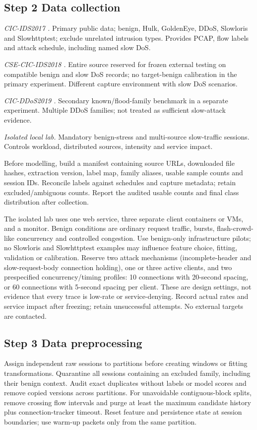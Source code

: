 \documentclass[conference]{IEEEtran}
\begin{document}
\subsection{Step 2 Data collection}
\noindent\textit{CIC-IDS2017 \cite{ref12}.} Primary public data; benign, Hulk, GoldenEye, DDoS, Slowloris and Slowhttptest; exclude unrelated intrusion types. Provides PCAP, flow labels and attack schedule, including named slow DoS.

\noindent\textit{CSE-CIC-IDS2018 \cite{ref13}.} Entire source reserved for frozen external testing on compatible benign and slow DoS records; no target-benign calibration in the primary experiment. Different capture environment with slow DoS scenarios.

\noindent\textit{CIC-DDoS2019 \cite{ref14}.} Secondary known/flood-family benchmark in a separate experiment. Multiple DDoS families; not treated as sufficient slow-attack evidence.

\noindent\textit{Isolated local lab.} Mandatory benign-stress and multi-source slow-traffic sessions. Controls workload, distributed sources, intensity and service impact.

Before modelling, build a manifest containing source URLs, downloaded file hashes, extraction version, label map, family aliases, usable sample counts and session IDs. Reconcile labels against schedules and capture metadata; retain excluded/ambiguous counts. Report the audited usable counts and final class distribution after collection.

The isolated lab uses one web service, three separate client containers or VMs, and a monitor. Benign conditions are ordinary request traffic, bursts, flash-crowd-like concurrency and controlled congestion. Use benign-only infrastructure pilots; no Slowloris and Slowhttptest examples may influence feature choice, fitting, validation or calibration. Reserve two attack mechanisms (incomplete-header and slow-request-body connection holding), one or three active clients, and two prespecified concurrency/timing profiles: 10 connections with 20-second spacing, or 60 connections with 5-second spacing per client. These are design settings, not evidence that every trace is low-rate or service-denying. Record actual rates and service impact after freezing; retain unsuccessful attempts. No external targets are contacted.

\subsection{Step 3 Data preprocessing}
Assign independent raw sessions to partitions before creating windows or fitting transformations. Quarantine all sessions containing an excluded family, including their benign context. Audit exact duplicates without labels or model scores and remove copied versions across partitions. For unavoidable contiguous-block splits, remove crossing flow intervals and purge at least the maximum candidate history plus connection-tracker timeout. Reset feature and persistence state at session boundaries; use warm-up packets only from the same partition.
\end{document}
